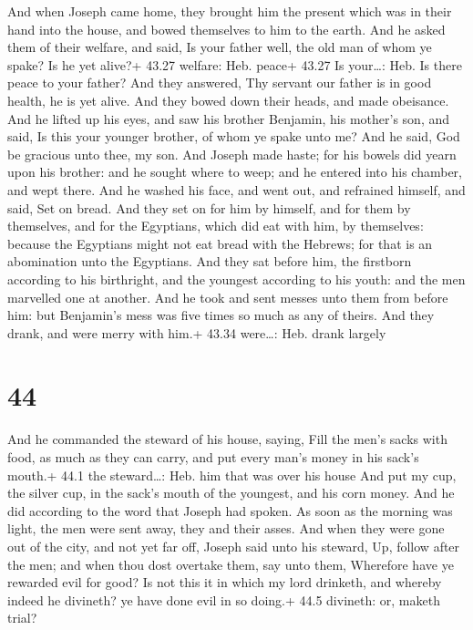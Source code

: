  And when Joseph came home, they brought him the present
which was in their hand into the house, and bowed themselves to him to
the earth.  And he asked them of their welfare, and said,
Is your father well, the old man of whom ye spake? Is he yet alive?+
43.27 welfare: Heb. peace+ 43.27 Is your\ldots: Heb. Is there peace to
your father?  And they answered, Thy servant our father is
in good health, he is yet alive. And they bowed down their heads, and
made obeisance.  And he lifted up his eyes, and saw his
brother Benjamin, his mother's son, and said, Is this your younger
brother, of whom ye spake unto me? And he said, God be gracious unto
thee, my son.  And Joseph made haste; for his bowels did
yearn upon his brother: and he sought where to weep; and he entered into
his chamber, and wept there.  And he washed his face, and
went out, and refrained himself, and said, Set on bread. 
And they set on for him by himself, and for them by themselves, and for
the Egyptians, which did eat with him, by themselves: because the
Egyptians might not eat bread with the Hebrews; for that is an
abomination unto the Egyptians.  And they sat before him,
the firstborn according to his birthright, and the youngest according to
his youth: and the men marvelled one at another.  And he
took and sent messes unto them from before him: but Benjamin's mess was
five times so much as any of theirs. And they drank, and were merry with
him.+ 43.34 were\ldots: Heb. drank largely

\hypertarget{section-43}{%
\section{44}\label{section-43}}

 And he commanded the steward of his house, saying, Fill the
men's sacks with food, as much as they can carry, and put every man's
money in his sack's mouth.+ 44.1 the steward\ldots: Heb. him that was
over his house  And put my cup, the silver cup, in the
sack's mouth of the youngest, and his corn money. And he did according
to the word that Joseph had spoken.  As soon as the morning
was light, the men were sent away, they and their asses. 
And when they were gone out of the city, and not yet far off, Joseph
said unto his steward, Up, follow after the men; and when thou dost
overtake them, say unto them, Wherefore have ye rewarded evil for good?
 Is not this it in which my lord drinketh, and whereby
indeed he divineth? ye have done evil in so doing.+ 44.5 divineth: or,
maketh trial?

